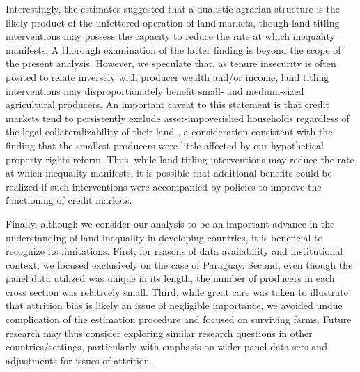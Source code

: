 \documentclass[english]{article}
\begin{document}
Interestingly, the estimates suggested that a dualistic agrarian structure is 
the likely product of the unfettered operation of land markets, though land 
titling interventions may possess the capacity to reduce the rate at which 
inequality manifests.
A thorough examination of the latter finding is beyond the scope of
the present analysis.
However, we speculate that, as tenure insecurity is often posited to relate
inversely with producer wealth and/or income, land titling interventions 
may disproportionately benefit small- and medium-sized agricultural 
producers.
An important caveat to this statement is that credit markets tend to 
persistently exclude asset-impoverished households regardless of the 
legal collateralizability of their land \citep{carter1988}, a consideration 
consistent with the finding that the smallest producers were little affected by 
our hypothetical property rights reform.
Thus, while land titling interventions may reduce the rate at which 
inequality manifests, it is possible that additional benefits could be realized if 
such interventions were accompanied by policies to improve the functioning
of credit markets.

Finally, although we consider our analysis to be an important advance in the 
understanding of land inequality in developing countries, it is beneficial to 
recognize its limitations.
First, for reasons of data availability and institutional context, we focused
exclusively on the case of Paraguay. 
Second, even though the panel data utilized was unique in its length, the
number of producers in each cross section was relatively small.
Third, while great care was taken to illustrate that attrition bias is likely
an issue of negligible importance, we avoided undue complication of the 
estimation procedure and focused on surviving farms.
Future research may thus consider exploring similar research questions in 
other countries/settings, particularly with emphasis on wider panel data 
sets and adjustments for issues of attrition.
 

\newpage
\cleardoublepage
\singlespacing




\newpage

\end{document}
